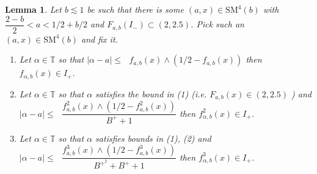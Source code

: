 \documentclass[12pt]{amsart}
\numberwithin{equation}{section}
\newtheorem{lemma}[theorem]{Lemma}
\theoremstyle{remark}
\begin{document}
\begin{lemma}\label{setting up1}
    Let $b\lesssim1$ be such that there is some $(a,x)\in \text{SM}^4(b)$ with $\dfrac{2-b}{2}<a <1/2+b/2$ and $F_{a,b}(I_-)\subset (2,2.5)$.
    Pick such an $(a,x)\in \text{SM}^{4}(b)$ and fix it. 
    \begin{enumerate}
        \item Let $\alpha \in \mathbb{T}$ so that $|\alpha-a| \leq \text{ } f_{a,b}(x) \wedge (1/2-f_{a,b}(x))$ then $f_{\alpha,b}(x)\in I_+$.
        \vspace{.3cm}
        
        \item Let $\alpha \in \mathbb{T}$ so that $\alpha$ satisfies the bound in (1) (i.e. $F_{a,b}(x) \in (2,2.5) $ ) 
        and $|\alpha-a| \leq \text{ } \dfrac{f^2_{a,b}(x) \wedge (1/2-f^2_{a,b}(x))}{B^++1} $ then $f^2_{\alpha,b}(x)\in I_+$.
          \vspace{.3cm}
        \item Let $\alpha \in \mathbb{T}$ so that $\alpha$ satisfies bounds in  (1), (2) and  $|\alpha-a| \leq \text{ } \dfrac{f^3_{a,b}(x) \wedge (1/2-f^3_{a,b}(x))}{B^{+^{2}}+B^++1} $ then $f^3_{\alpha,b}(x)\in I_+$.
        
    \end{enumerate}
\end{lemma}
\end{document}
